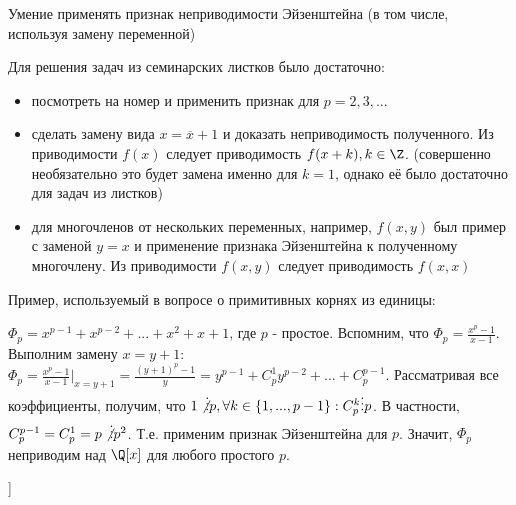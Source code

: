 \begin{problem} [29 (6.2)]
	Умение применять признак неприводимости Эйзенштейна (в том числе, используя замену переменной)
\end{problem}
\begin{solution}
	Для решения задач из семинарских листков было достаточно:
	\begin{itemize}
		\item посмотреть на номер и применить признак для $p = 2, 3, ... $
		\item сделать замену вида $x = \overline{x} + 1$ и доказать неприводимость полученного. Из приводимости $f(x)$ следует приводимость $f(x + k), k \in \Z$. (совершенно необязательно это будет замена именно для $k = 1$, однако её было достаточно для задач из листков)
		\item для многочленов от нескольких переменных, например, $f(x,y)$ был пример с заменой $y = x$ и применение признака Эйзенштейна к полученному многочлену. Из приводимости $f(x, y)$ следует приводимость $f(x, x)$
	\end{itemize}
	Пример, используемый в вопросе о примитивных корнях из единицы:
	
	$\Phi_p = x^{p-1} + x^{p-2} + ... + x^2 + x + 1$, где $p$ - простое. Вспомним, что $\Phi_p = \frac{x^p - 1}{x-1}$. Выполним замену $x = y + 1$: $\Phi_p = \frac{x^p - 1}{x-1}|_{x=y+1} = \frac{(y+1)^p - 1}{y} = y^{p-1} + C_p^1y^{p-2}+...+C_p^{p-1}$. Рассматривая все коэффициенты, получим, что $1 \not\vdots p, \forall k \in \{1,...,p-1\}: C_p^k \vdots p$. В частности, $C_p^{p-1} = C_p^1 = p \not\vdots p^2$. Т.е. применим признак Эйзенштейна для $p$. Значит, $\Phi_p$ неприводим над $\Q[x]$ для любого простого $p$.  
\end{solution}


\begin{problem} [?? (?.?)]
\end{problem}
\begin{solution}
\end{solution}

\begin{problem}[?? [Каргальцев]]
\end{problem}

